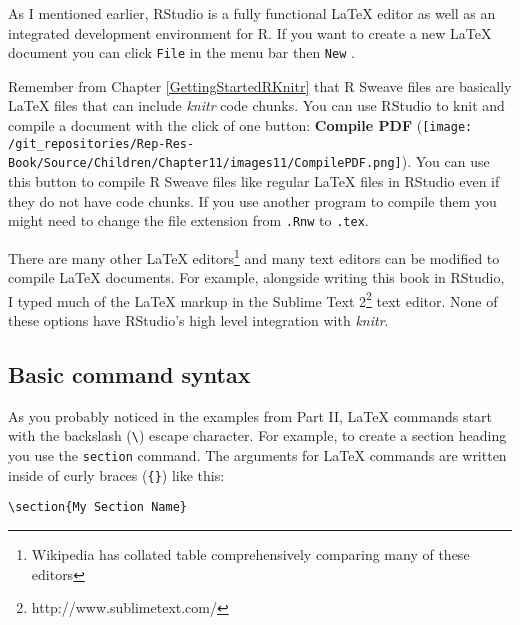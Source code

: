 As I mentioned earlier, RStudio is a fully functional LaTeX editor as well as an integrated development environment for R. If you want to create a new LaTeX document you can click {\tt{File}} in the menu bar then {\tt{New}} . 

Remember from Chapter \ref{GettingStartedRKnitr} that R Sweave files are basically LaTeX files that can include {\emph{knitr}} code chunks. You can use RStudio to knit and compile a document with the click of one button: \textbf{Compile PDF} (\texttt{[image: /git\_repositories/Rep-Res-Book/Source/Children/Chapter11/images11/CompilePDF.png]}). You can use this button to compile R Sweave files like regular LaTeX files in RStudio even if they do not have code chunks. If you use another program to compile them you might need to change the file extension from {\tt{.Rnw}} to {\tt{.tex}}.

There are many other LaTeX editors\footnote{Wikipedia has collated table comprehensively comparing many of these editors} and many text editors can be modified to compile LaTeX documents. For example, alongside writing this book in RStudio, I typed much of the LaTeX markup in the Sublime Text 2\footnote{http://www.sublimetext.com/} text editor. None of these options have RStudio's high level integration with \emph{knitr}.

\subsection{Basic command syntax}

As you probably noticed in the examples from Part II, LaTeX commands start with the backslash (\texttt{\textbackslash{}}) escape character. For example, to create a section heading you use the \texttt{section} command. The arguments for LaTeX commands are written inside of curly braces (\verb|{}|) like this:

\begin{knitrout}
    \color{fgcolor}
    \begin{kframe}
        \begin{verbatim}
\section{My Section Name}
            \end{verbatim}
        \end{kframe}
\end{knitrout}

